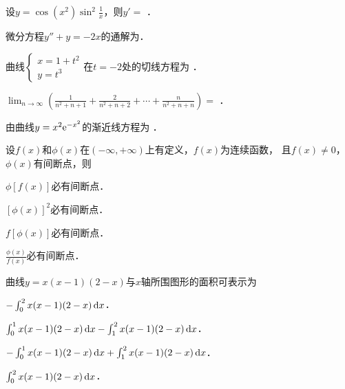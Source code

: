 \documentclass[plain,noanswer,medmath]{../../template/jnuexam}
\begin{document}






\begin{problem}
设$y = \cos(x^2)\sin^2\frac{1}{x}$，则$y' =$ \fillin{}．
\end{problem}


\begin{problem}
微分方程$y'' + y = - 2x$的通解为\fillin{}．
\end{problem}


\begin{problem}
曲线$\begin{cases}
  x = 1 + t^2 \\
  y = t^3
\end{cases}$在$t = - 2$处的切线方程为 \fillin{}．
\end{problem}


\begin{problem}
$\lim_{n \to \infty} \left(\frac{1}{n^2 + n + 1} + \frac{2}{n^2 + n + 2}
+ \cdots + \frac{n}{n^2 + n + n} \right) =$ \fillin{}．
\end{problem}


\begin{problem}
由曲线$y = x^2\mathrm{e}^{- x^2}$的渐近线方程为 \fillin{}．
\end{problem}




\begin{problem}
设$f(x)$和$\phi (x)$在$(-\infty, +\infty)$上有定义，$f(x)$为连续函数，
且$f(x) \ne 0$，$\phi (x)$有间断点，则\pickout{}
\begin{abcd}
\item $\phi [f(x)]$必有间断点．		
\item $[\phi(x)]^2$必有间断点．
\item $f[\phi(x)]$必有间断点．		
\item $\frac{\phi(x)}{f(x)}$必有间断点．
\end{abcd}
\end{problem}


\begin{problem}
曲线$y = x(x - 1)(2 - x)$与$x$轴所围图形的面积可表示为\pickout{}
\begin{abcd}
\item $- \int_0^2x(x - 1)(2 - x)\mathop{}\!\mathrm{d} x$．
\item $\int_0^1x(x - 1)(2 - x)\mathop{}\!\mathrm{d} x - \int_1^2x(x - 1)(2 - x)\mathop{}\!\mathrm{d} x$．
\item $- \int_0^1x(x - 1)(2 - x)\mathop{}\!\mathrm{d} x + \int_1^2x(x - 1)(2 - x)\mathop{}\!\mathrm{d} x$．
\item $\int_0^2x(x - 1)(2 - x)\mathop{}\!\mathrm{d} x$．
\end{abcd}
\end{problem}
\end{document}
